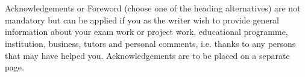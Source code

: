 \section*{}\label{sec:acknowledgements}
{} 
Acknowledgements or Foreword (choose one of the heading alternatives) are not
mandatory but can be applied if you as the writer wish to provide general
information about your exam work or project work, educational programme,
institution, business, tutors and personal comments, i.e. thanks to any persons
that may have helped you. Acknowledgements are to be placed on a separate page.
